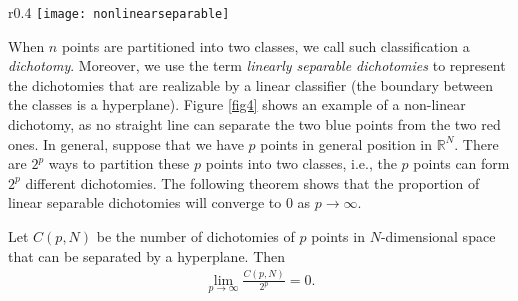 \begin{wrapfigure}{r}{0.4\textwidth}
\centering
\texttt{[image: nonlinearseparable]}
\caption{A non-linear dichotomy}
\label{fig4}
\end{wrapfigure}

When $n$ points are partitioned into two classes, we call such classification a \textit{dichotomy}. Moreover, we use the term \textit{linearly separable dichotomies} to represent the dichotomies that are realizable by a linear classifier (the boundary between the classes is a hyperplane). Figure \ref{fig4} shows an example of a non-linear dichotomy, as no straight line can separate the two blue points from the two red ones. In general, suppose that we have $p$ points in general position in $\mathbb{R}^N$. There are $2^p$ ways to partition these $p$ points into two classes, i.e., the $p$ points can form $2^p$ different dichotomies. The following theorem shows that the proportion of linear separable dichotomies will converge to 0 as $p\rightarrow\infty$. 








\begin{theorem}[Cover, 1965]
Let $C(p, N)$ be the number of dichotomies of $p$ points in $N$-dimensional space that can be separated by a hyperplane. Then
\begin{align*}
\lim_{p\rightarrow\infty}\frac{C(p,N)}{2^p}=0.
\end{align*}
\end{theorem}

